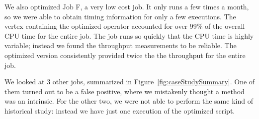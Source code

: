 We also optimized Job F, a very low cost job.
It only runs a few times a month, so we were able to obtain timing information for only a few executions.
The vertex containing the optimized operator accounted for over 99\% of the overall CPU time for the entire job.
The job runs so quickly that the CPU time is highly variable; instead we found the throughput measurements to be reliable.
The optimized version consistently provided twice the the throughput for the entire job.

We looked at 3 other jobs, summarized in Figure~\ref{fig:caseStudySummary}.
One of them turned out to be a false positive, where we mistakenly thought a method was an intrinsic.
For the other two, we were not able to perform the same kind of historical study: instead we have just one execution of the optimized script.


